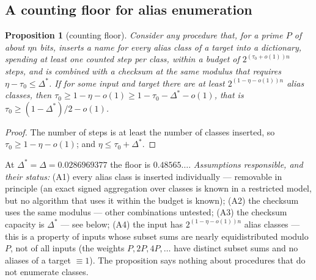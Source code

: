 \documentclass[11pt]{article}
\newtheorem{proposition}[lemma]{Proposition}
\theoremstyle{definition}
\begin{document}
\subsection{A counting floor for alias enumeration}
\begin{proposition}[counting floor]\label{prop:floor}
Consider any procedure that, for a prime $P$ of about $\eta n$ bits, inserts a name for every alias class of a
target into a dictionary, spending at least one counted step per class, within a budget of $2^{(\tau_0+o(1))n}$
steps, and is combined with a checksum at the same modulus that requires $\eta-\tau_0\le\Delta^\ast$. If for some
input and target there are at least $2^{(1-\eta-o(1))n}$ alias classes, then
$\tau_0\ge1-\eta-o(1)\ge1-\tau_0-\Delta^\ast-o(1)$, that is $\tau_0\ge(1-\Delta^\ast)/2-o(1)$.
\end{proposition}
\begin{proof}
The number of steps is at least the number of classes inserted, so $\tau_0\ge1-\eta-o(1)$; and
$\eta\le\tau_0+\Delta^\ast$.
\end{proof}
At $\Delta^\ast=\Delta=0.0286969377$ the floor is $0.48565\ldots$. \emph{Assumptions responsible, and their status:}
(A1) every alias class is inserted individually --- removable in
principle (an exact signed aggregation over classes is known in a restricted model, but no algorithm that uses it
within the budget is known); (A2) the checksum uses the same modulus --- other combinations untested; (A3) the
checksum capacity is $\Delta^\ast$ --- see below; (A4) the input has $2^{(1-\eta-o(1))n}$ alias classes --- this is a
property of inputs whose subset sums are nearly equidistributed modulo $P$, not of all inputs (the weights
$P,2P,4P,\dots$ have distinct subset sums and no aliases of a target $\equiv1$). The proposition says nothing about
procedures that do not enumerate classes.
\end{document}

